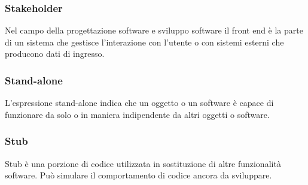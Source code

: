 \subsubsection*{Stakeholder}
Nel campo della progettazione software e sviluppo software il front end è la parte di un sistema che gestisce l’interazione con l’utente o con sistemi esterni che producono dati di ingresso.
\subsubsection*{Stand-alone}
L'espressione stand-alone indica che un oggetto o un software è capace di funzionare da solo o in maniera indipendente da altri oggetti o software.
\subsubsection*{Stub}
Stub è una porzione di codice utilizzata in sostituzione di altre funzionalità software. Può simulare il comportamento di codice ancora da sviluppare.
